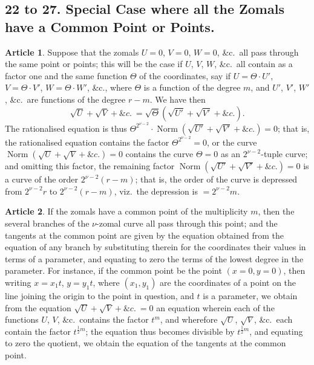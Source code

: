 \documentclass[11pt,a4paper]{article}
\theoremstyle{definition}
\newtheorem{art}{Article}
\DeclareMathOperator{\Norm}{Norm}
\newcommand{\norm}{\Norm}
\begin{document}
\subsection{22 to 27. Special Case where all the Zomals have a Common Point or Points.}

\begin{art}
Suppose that the zomals $U = 0$, $V = 0$, $W = 0$, \&c.\ all pass through the same point or points; this will be the case if $U$, $V$, $W$, \&c.\ all contain as a factor one and the same function $\Theta$ of the coordinates, say if $U = \Theta \cdot U'$, $V = \Theta \cdot V'$, $W = \Theta \cdot W'$, \&c., where $\Theta$ is a function of the degree $m$, and $U'$, $V'$, $W'$, \&c.\ are functions of the degree $r - m$. We have then
\[
\sqrt{U} + \sqrt{V} + \&c.\ = \sqrt{\Theta}(\sqrt{U'} + \sqrt{V'} + \&c.).
\]
The rationalised equation is thus $\Theta^{2^{\nu-2}} \cdot \norm(\sqrt{U'} + \sqrt{V'} + \&c.) = 0$; that is, the rationalised equation contains the factor $\Theta^{2^{\nu-2}} = 0$, or the curve $\norm(\sqrt{U} + \sqrt{V} + \&c.) = 0$ contains the curve $\Theta = 0$ as an $2^{\nu-2}$-tuple curve; and omitting this factor, the remaining factor $\norm(\sqrt{U'} + \sqrt{V'} + \&c.) = 0$ is a curve of the order $2^{\nu-2}(r - m)$; that is, the order of the curve is depressed from $2^{\nu-2}r$ to $2^{\nu-2}(r - m)$, viz.\ the depression is $= 2^{\nu-2}m$.
\end{art}

\begin{art}
If the zomals have a common point of the multiplicity $m$, then the several branches of the $\nu$-zomal curve all pass through this point; and the tangents at the common point are given by the equation obtained from the equation of any branch by substituting therein for the coordinates their values in terms of a parameter, and equating to zero the terms of the lowest degree in the parameter. For instance, if the common point be the point $(x = 0, y = 0)$, then writing $x = x_{1}t$, $y = y_{1}t$, where $(x_{1}, y_{1})$ are the coordinates of a point on the line joining the origin to the point in question, and $t$ is a parameter, we obtain from the equation $\sqrt{U} + \sqrt{V} + \&c.\ = 0$ an equation wherein each of the functions $U$, $V$, \&c.\ contains the factor $t^{m}$, and wherefore $\sqrt{U}$, $\sqrt{V}$, \&c.\ each contain the factor $t^{\frac{1}{2}m}$; the equation thus becomes divisible by $t^{\frac{1}{2}m}$, and equating to zero the quotient, we obtain the equation of the tangents at the common point.
\end{art}
\end{document}

